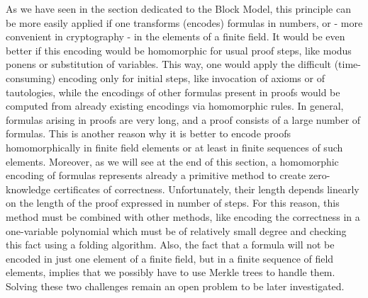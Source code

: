 \documentclass{article}
\theoremstyle{plain}
\theoremstyle{definition}
\begin{document}
As we have seen in the section dedicated to the Block Model, this principle can be more easily applied if one transforms (encodes) formulas in numbers, or - more convenient in cryptography - in the elements of a finite field. It would be even better if this encoding would be homomorphic for usual proof steps, like modus ponens or substitution of variables. This way, one would apply the difficult (time-consuming) encoding only for initial steps, like invocation of axioms or of tautologies, while the encodings of other formulas present in proofs would be computed from already existing encodings via homomorphic rules. 
In general, formulas arising in proofs are very long, and a proof consists of a large number of formulas. This is another reason why it is better to encode proofs homomorphically in finite field elements or at least in finite sequences of such elements. Moreover, as we will see at the end of this section, a homomorphic encoding of formulas represents already a primitive method to create zero-knowledge certificates of correctness. Unfortunately, their length depends linearly on the length of the proof expressed in number of steps. For this reason, this method must be combined with other methods, like encoding the correctness in a one-variable polynomial which must be of relatively small degree and checking this fact using a folding algorithm. Also, the fact that a formula will not be encoded in just one element of a finite field, but in a finite sequence of field elements, implies that we possibly have to use Merkle trees to handle them. Solving these two challenges remain an open problem to be later investigated.
\end{document}

